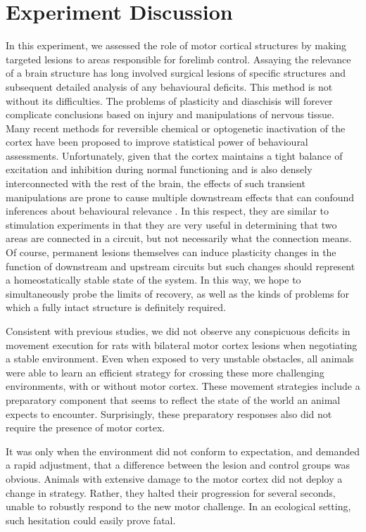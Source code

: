 \section{Experiment Discussion}

In this experiment, we assessed the role of motor cortical structures by making targeted lesions to areas responsible for forelimb control. Assaying the relevance of a brain structure has long involved surgical lesions of specific structures and subsequent detailed analysis of any behavioural deficits. This method is not without its difficulties. The problems of plasticity and diaschisis will forever complicate conclusions based on injury and manipulations of nervous tissue. Many recent methods for reversible chemical or optogenetic inactivation of the cortex have been proposed to improve statistical power of behavioural assessments. Unfortunately, given that the cortex maintains a tight balance of excitation and inhibition during normal functioning and is also densely interconnected with the rest of the brain, the effects of such transient manipulations are prone to cause multiple downstream effects that can confound inferences about behavioural relevance \cite{Otchy2015}. In this respect, they are similar to stimulation experiments in that they are very useful in determining that two areas are connected in a circuit, but not necessarily what the connection means. Of course, permanent lesions themselves can induce plasticity changes in the function of downstream and upstream circuits but such changes should represent a homeostatically stable state of the system. In this way, we hope to simultaneously probe the limits of recovery, as well as the kinds of problems for which a fully intact structure is definitely required.

Consistent with previous studies, we did not observe any conspicuous deficits in movement execution for rats with bilateral motor cortex lesions when negotiating a stable environment. Even when exposed to very unstable obstacles, all animals were able to learn an efficient strategy for crossing these more challenging environments, with or without motor cortex. These movement strategies include a preparatory component that seems to reflect the state of the world an animal expects to encounter. Surprisingly, these preparatory responses also did not require the presence of motor cortex.

It was only when the environment did not conform to expectation, and demanded a rapid adjustment, that a difference between the lesion and control groups was obvious. Animals with extensive damage to the motor cortex did not deploy a change in strategy. Rather, they halted their progression for several seconds, unable to robustly respond to the new motor challenge. In an ecological setting, such hesitation could easily prove fatal.

